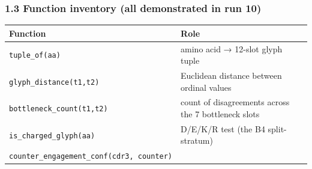 \hypertarget{function-inventory-all-demonstrated-in-run-10}{%
\subsubsection{1.3 Function inventory (all demonstrated in run
10)}\label{function-inventory-all-demonstrated-in-run-10}}

\begin{longtable}[]{@{}ll@{}}
\toprule
\begin{minipage}[b]{0.47\columnwidth}\raggedright
Function\strut
\end{minipage} & \begin{minipage}[b]{0.47\columnwidth}\raggedright
Role\strut
\end{minipage}\tabularnewline
\midrule
\endhead
\begin{minipage}[t]{0.47\columnwidth}\raggedright
\texttt{tuple\_of(aa)}\strut
\end{minipage} & \begin{minipage}[t]{0.47\columnwidth}\raggedright
amino acid → 12-slot glyph tuple\strut
\end{minipage}\tabularnewline
\begin{minipage}[t]{0.47\columnwidth}\raggedright
\texttt{glyph\_distance(t1,t2)}\strut
\end{minipage} & \begin{minipage}[t]{0.47\columnwidth}\raggedright
Euclidean distance between ordinal values\strut
\end{minipage}\tabularnewline
\begin{minipage}[t]{0.47\columnwidth}\raggedright
\texttt{bottleneck\_count(t1,t2)}\strut
\end{minipage} & \begin{minipage}[t]{0.47\columnwidth}\raggedright
count of disagreements across the 7 bottleneck slots\strut
\end{minipage}\tabularnewline
\begin{minipage}[t]{0.47\columnwidth}\raggedright
\texttt{is\_charged\_glyph(aa)}\strut
\end{minipage} & \begin{minipage}[t]{0.47\columnwidth}\raggedright
D/E/K/R test (the B4 split-stratum)\strut
\end{minipage}\tabularnewline
\begin{minipage}[t]{0.47\columnwidth}\raggedright
\texttt{counter\_engagement\_conf(cdr3,\ counter)}\strut
\end{minipage} & \begin{minipage}[t]{0.47\columnwidth}\raggedright

\end{minipage}
\end{longtable}
